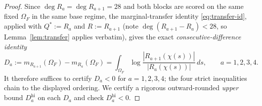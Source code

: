 \documentclass[11pt,reqno]{amsart}
\theoremstyle{plain}
\theoremstyle{definition}
\theoremstyle{remark}
\begin{document}
\begin{proof}
Since $\deg R_a=\deg R_{a+1}=28$ and both blocks are scored on the same fixed
$\Omega_F$ in the same base regime, the marginal-transfer identity
\eqref{eq:transfer-id}, applied with $Q^*:=R_a$ and $R:=R_{a+1}$ (note
$\deg(R_{a+1}-R_a)<28$, so Lemma~\ref{lem:transfer} applies verbatim), gives the exact
\emph{consecutive-difference identity}
\begin{equation}\label{eq:diff-id}
  D_a:=m_{R_{a+1}}(\Omega_F)-m_{R_a}(\Omega_F)
     =\int_{\Omega_F}\log\frac{|R_{a+1}(\chi(s))|}{|R_a(\chi(s))|}\,ds,
  \qquad a=1,2,3,4 .
\end{equation}
It therefore suffices to certify $D_a<0$ for $a=1,2,3,4$; the four strict inequalities
chain to the displayed ordering. We certify a rigorous outward-rounded \emph{upper}
bound $D_a^{\mathrm{hi}}$ on each $D_a$ and check $D_a^{\mathrm{hi}}<0$.


\end{proof}
\end{document}

